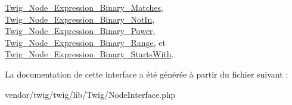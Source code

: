 \hyperlink{class_twig___node___expression___binary___matches_a4e0faa87c3fae583620b84d3607085da}{Twig\+\_\+\+Node\+\_\+\+Expression\+\_\+\+Binary\+\_\+\+Matches}, \hyperlink{class_twig___node___expression___binary___not_in_a4e0faa87c3fae583620b84d3607085da}{Twig\+\_\+\+Node\+\_\+\+Expression\+\_\+\+Binary\+\_\+\+Not\+In}, \hyperlink{class_twig___node___expression___binary___power_a4e0faa87c3fae583620b84d3607085da}{Twig\+\_\+\+Node\+\_\+\+Expression\+\_\+\+Binary\+\_\+\+Power}, \hyperlink{class_twig___node___expression___binary___range_a4e0faa87c3fae583620b84d3607085da}{Twig\+\_\+\+Node\+\_\+\+Expression\+\_\+\+Binary\+\_\+\+Range}, et \hyperlink{class_twig___node___expression___binary___starts_with_a4e0faa87c3fae583620b84d3607085da}{Twig\+\_\+\+Node\+\_\+\+Expression\+\_\+\+Binary\+\_\+\+Starts\+With}.



La documentation de cette interface a été générée à partir du fichier suivant \+:\begin{DoxyCompactItemize}
\item 
vendor/twig/twig/lib/\+Twig/Node\+Interface.\+php\end{DoxyCompactItemize}
